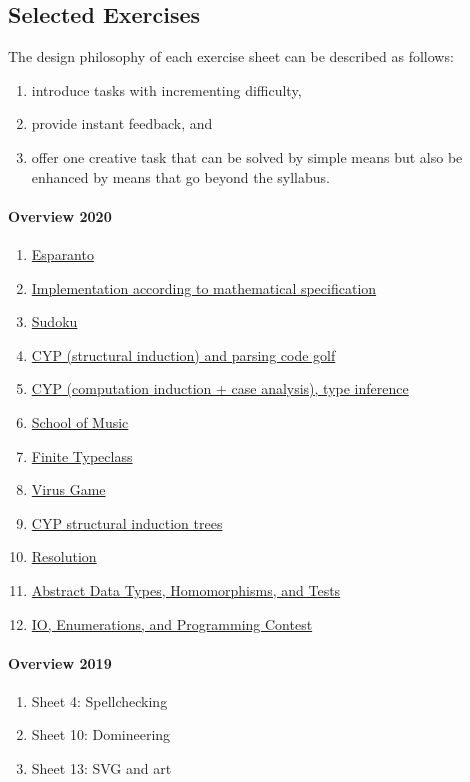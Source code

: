 \subsection{Selected Exercises}\label{sec:selected_exercises}

The design philosophy of each exercise sheet
can be described as follows:
\begin{enumerate}
  \item introduce tasks with incrementing difficulty,
  \item provide instant feedback, and
  \item offer one creative task that can be solved by simple means but also be enhanced by means that go beyond the syllabus.
\end{enumerate}


\paragraph{Overview 2020}
\begin{enumerate}
\item \href{https://www21.in.tum.de/teaching/fpv/WS20/assets/ex01.pdf}{Esparanto}
\item \href{https://www21.in.tum.de/teaching/fpv/WS20/assets/ex02.pdf}{Implementation according to mathematical specification}
\item \href{https://www21.in.tum.de/teaching/fpv/WS20/assets/ex03.pdf}{Sudoku}
\item \href{https://www21.in.tum.de/teaching/fpv/WS20/assets/ex04.pdf}{CYP (structural induction) and parsing code golf}
\item \href{https://www21.in.tum.de/teaching/fpv/WS20/assets/ex05.pdf}{CYP (computation induction + case analysis), type inference}
\item \href{https://www21.in.tum.de/teaching/fpv/WS20/assets/ex06.pdf}{School of Music}
\item \href{https://www21.in.tum.de/teaching/fpv/WS20/assets/ex07.pdf}{Finite Typeclass}
\item \href{https://www21.in.tum.de/teaching/fpv/WS20/assets/ex08.pdf}{Virus Game}
\item \href{https://www21.in.tum.de/teaching/fpv/WS20/assets/ex09.pdf}{CYP structural induction trees}
\item \href{https://www21.in.tum.de/teaching/fpv/WS20/assets/ex10.pdf}{Resolution}
\item \href{https://www21.in.tum.de/teaching/fpv/WS20/assets/ex11.pdf}{Abstract Data Types, Homomorphisms, and Tests}
\item \href{https://www21.in.tum.de/teaching/fpv/WS20/assets/ex12.pdf}{IO, Enumerations, and Programming Contest}
\end{enumerate}

\paragraph{Overview 2019}
\begin{enumerate}
\item Sheet 4: Spellchecking
\item Sheet 10: Domineering
\item Sheet 13: SVG and art
\end{enumerate}
